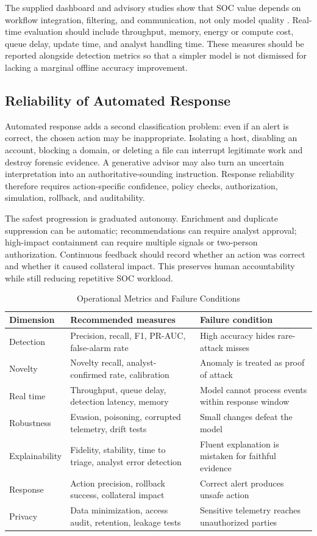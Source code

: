 \documentclass[conference]{IEEEtran}
\begin{document}
The supplied dashboard and advisory studies show that SOC value depends on workflow integration, filtering, and communication, not only model quality \cite{Kaufhold2022,Abeywardena2023}. Real-time evaluation should include throughput, memory, energy or compute cost, queue delay, update time, and analyst handling time. These measures should be reported alongside detection metrics so that a simpler model is not dismissed for lacking a marginal offline accuracy improvement.

\subsection{Reliability of Automated Response}
Automated response adds a second classification problem: even if an alert is correct, the chosen action may be inappropriate. Isolating a host, disabling an account, blocking a domain, or deleting a file can interrupt legitimate work and destroy forensic evidence. A generative advisor may also turn an uncertain interpretation into an authoritative-sounding instruction. Response reliability therefore requires action-specific confidence, policy checks, authorization, simulation, rollback, and auditability.

The safest progression is graduated autonomy. Enrichment and duplicate suppression can be automatic; recommendations can require analyst approval; high-impact containment can require multiple signals or two-person authorization. Continuous feedback should record whether an action was correct and whether it caused collateral impact. This preserves human accountability while still reducing repetitive SOC workload.

\begin{table}[t]
\caption{Operational Metrics and Failure Conditions}
\label{tab:metrics}
\centering\scriptsize
\begin{tabularx}{\columnwidth}{Y Y Y}
\toprule
Dimension & Recommended measures & Failure condition\\
\midrule
Detection & Precision, recall, F1, PR-AUC, false-alarm rate & High accuracy hides rare-attack misses\\
Novelty & Novelty recall, analyst-confirmed rate, calibration & Anomaly is treated as proof of attack\\
Real time & Throughput, queue delay, detection latency, memory & Model cannot process events within response window\\
Robustness & Evasion, poisoning, corrupted telemetry, drift tests & Small changes defeat the model\\
Explainability & Fidelity, stability, time to triage, analyst error detection & Fluent explanation is mistaken for faithful evidence\\
Response & Action precision, rollback success, collateral impact & Correct alert produces unsafe action\\
Privacy & Data minimization, access audit, retention, leakage tests & Sensitive telemetry reaches unauthorized parties\\
\bottomrule
\end{tabularx}
\end{table}
\end{document}
